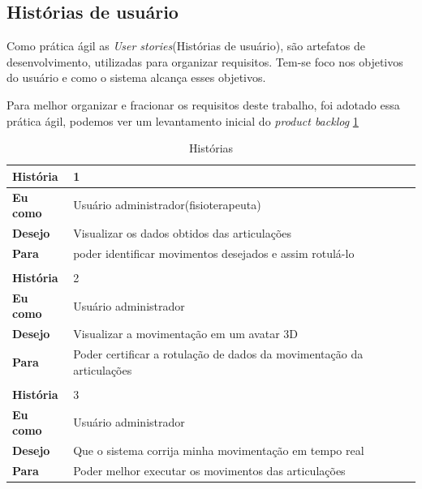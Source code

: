 \subsection{Histórias de usuário}
\label{Sec:Histórias de usuário}
  Como prática ágil as \textit{User stories}(Histórias de usuário), são artefatos
de desenvolvimento, utilizadas para organizar requisitos. Tem-se foco nos objetivos
do usuário e como o sistema alcança esses objetivos.
  
  Para melhor organizar e fracionar os requisitos deste trabalho, foi adotado 
essa prática ágil, podemos ver um levantamento inicial do \textit{product backlog} \ref{historias}
\begin{table}[]
\centering
\caption{Histórias}
\label{historias}
\begin{tabular}{|l|l|}
\hline
\textbf{História} & 1                                                        \\ \hline
\textbf{Eu como}  & Usuário administrador(fisioterapeuta)                    \\ \hline
\textbf{Desejo}   & Visualizar os dados obtidos das articulações                   \\ \hline
\textbf{Para}     & poder identificar movimentos desejados e assim rotulá-lo \\ \hline
 \multicolumn{2}{|l|}{}                                                       \\ \hline
\textbf{História} & 2                                                        \\ \hline
\textbf{Eu como}  & Usuário administrador                                    \\ \hline
\textbf{Desejo}   & Visualizar a movimentação em um avatar 3D                \\ \hline
\textbf{Para}     & Poder certificar a rotulação de dados da movimentação da articulações\\ \hline
\multicolumn{2}{|l|}{}                                                       \\ \hline
\textbf{História} & 3                                                        \\ \hline
\textbf{Eu como}  & Usuário administrador                                    \\ \hline
\textbf{Desejo}   & Que o sistema corrija minha movimentação em tempo real   \\ \hline
\textbf{Para}     & Poder melhor executar os movimentos das articulações           \\ \hline

\end{tabular}
\end{table}

